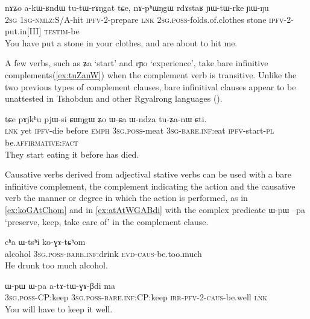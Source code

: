 \documentclass[oldfontcommands,oneside,a4paper,11pt]{article}
\newcommand{\ipa}[1]{{\phon#1}} %
\begin{document}
 \begin{exe}
\ex \label{ex:akWRndW}
\gll
\ipa{nɤʑo}  	\ipa{a-kɯ-ʁndɯ}  	\ipa{tu-tɯ-rɤŋgat}  	\ipa{tɕe,}  	\ipa{nɤ-pʰɯŋgɯ}  	\ipa{rdɤstaʁ}  	\ipa{ɲɯ-tɯ-rke}  	\ipa{ɲɯ-ŋu}  \\
\textsc{2sg} \textsc{1sg-nmlz}:S/A-hit \textsc{ipfv}-2-prepare \textsc{lnk} \textsc{2sg.poss}-folds.of.clothes stone \textsc{ipfv}-2-put.in[III] \textsc{testim}-be \\
\glt You have put a stone in your clothes, and are about to hit me.
\end{exe}

A few verbs, such as \ipa{ʑa} `start' and \ipa{rɲo} `experience', take bare infinitive complements(\ref{ex:tuZanW}) when the complement verb is transitive. Unlike the two previous types of complement clauses, bare infinitival clauses appear to be unattested in Tshobdun and other Rgyalrong languages (\citealt{sun12complementation}).

 \begin{exe}
\ex \label{ex:tuZanW}
\gll
\ipa{tɕe}  	\ipa{pɤjkʰu}  	\ipa{pjɯ-si}  	\ipa{ɕɯŋgɯ}  	\ipa{ʑo}  	\ipa{ɯ-ɕa}  	\ipa{ɯ-ndza}  	\ipa{tu-ʑa-nɯ}  	\ipa{ɕti.}  \\
\textsc{lnk} yet \textsc{ipfv}-die before \textsc{emph} \textsc{3sg.poss}-meat \textsc{3sg-bare.inf}:eat \textsc{ipfv}-start-\textsc{pl}  be.\textsc{affirmative}:\textsc{fact} \\
 \glt They start eating it before has died.
\end{exe}

Causative verbs derived from adjectival stative verbs can be used with a bare infinitive complement, the complement indicating the action and the causative verb the manner or degree in which the action is performed, as in \ref{ex:koGAtChom} and in \ref{ex:atAtWGABdi} with the complex predicate \ipa{ɯ-pɯ} \ipa{--pa} `preserve, keep, take care of' in the complement clause.

 \begin{exe}
\ex \label{ex:koGAtChom}
\gll
\ipa{cʰa} \ipa{ɯ-tsʰi} \ipa{ko-ɣɤ-tɕʰom} \\
alcohol \textsc{3sg.poss}-\textsc{bare.inf}:drink \textsc{evd-caus}-be.too.much \\
\glt He drunk too much alcohol.
\end{exe}
 \begin{exe}
\ex \label{ex:atAtWGABdi}
\gll
\ipa{ɯ-pɯ}  	\ipa{ɯ-pa}  	\ipa{a-tɤ-tɯ-ɣɤ-βdi}  	\ipa{ma}  \\
\textsc{3sg.poss}-CP:keep \textsc{3sg.poss}-\textsc{bare.inf}:CP:keep \textsc{irr-pfv-2-caus}-be.well \textsc{lnk} \\
\glt You will have to keep it well.
\end{exe}
\end{document}
